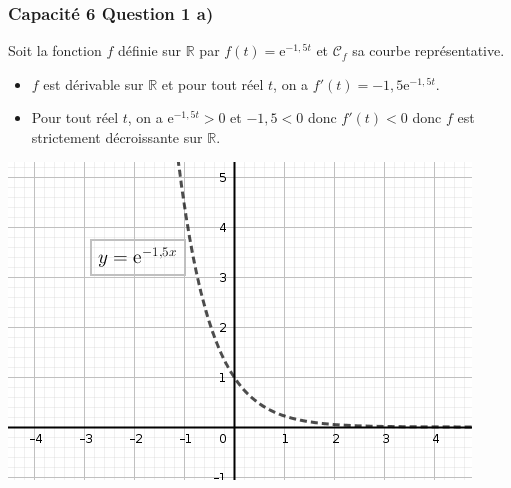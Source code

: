 \documentclass[11pt, hyperref={urlcolor=red,%
            linkcolor=blue, %
            colorlinks=true}]{beamer}
\newcommand{\R}{\mathbb{R}}
\newcommand{\courbe}[1]{\ensuremath{\mathcal{C}_{#1}}}
\begin{document}
\begin{frame}
\frametitle{Capacité 6 Question 1 a)}
\label{capacite6}

Soit la fonction $f$ définie sur $\R$ par $f(t)=\text{e}^{-1,5t}$ et $\courbe{f}$ sa courbe représentative.

\begin{itemize}
\item $f$ est dérivable sur $\R$  et pour tout réel $t$, on a $f'(t)=-1,5\text{e}^{-1,5t}$.
\item Pour tout réel $t$, on a $\text{e}^{-1,5t}>0$ et $-1,5<0$ donc $f'(t)<0$ donc $f$ est strictement décroissante sur $\R$.
\end{itemize}

\begin{center}
\includegraphics[scale=0.3]{capacite6.png}
\end{center}


\end{frame}
\end{document}
